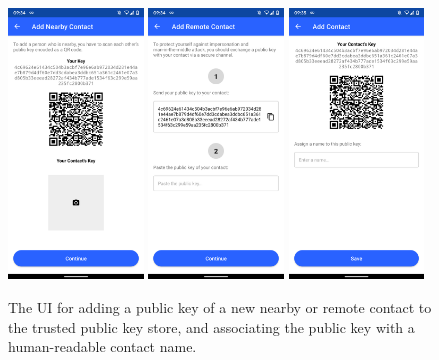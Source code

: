 \begin{figure}
    \centering
    \includegraphics[width=0.32\textwidth]{screens/superapp/add_nearby_contact}
    \includegraphics[width=0.32\textwidth]{screens/superapp/add_remote_contact}
    \includegraphics[width=0.32\textwidth]{screens/superapp/add_contact}
    \caption{The UI for adding a public key of a new nearby or remote contact to the trusted public key store, and associating the public key with a human-readable contact name.}
    \label{screen_keyexchange}
\end{figure}

